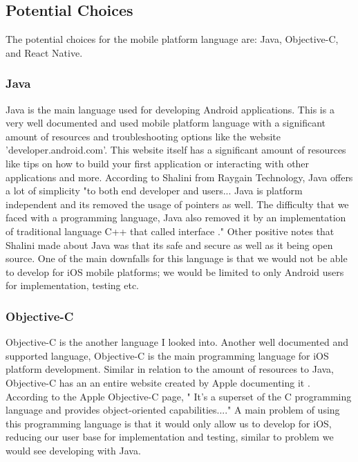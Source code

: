 \documentclass[compsoc, 10, draftclsnofoot, onecolumn]{IEEEtran}
\begin{document}
\subsection{Potential Choices } The potential choices for the mobile platform language are: Java, Objective-C, and React Native. 
\subsubsection{Java}
Java is the main language used for developing Android applications. This is a very well documented and used mobile platform language with a significant amount of resources and troubleshooting options like the website 'developer.android.com'. This website itself has a significant amount of resources like tips on how to build your first application or interacting with other applications and more. According to Shalini from Raygain Technology, Java offers a lot of simplicity "to both end developer and users... Java is platform independent and its removed the usage of pointers as well. The difficulty that we faced with a programming language, Java also removed it by an implementation of traditional language C++ that called interface \cite{r4}." Other positive notes that Shalini made about Java was that its safe and secure as well as it being open source. One of the main downfalls for this language is that we would not be able to develop for iOS mobile platforms; we would be limited to only Android users for implementation, testing etc.

\subsubsection{Objective-C}
\indent Objective-C is the another language I looked into. Another well documented and supported language, Objective-C is the main programming language for iOS platform development. Similar in relation to the amount of resources to Java, Objective-C has an an entire website created by Apple documenting it \cite{r5}. According to the Apple Objective-C page, " It’s a superset of the C programming language and provides object-oriented capabilities...\cite{r5}." A main problem of using this programming language is that it would only allow us to develop for iOS, reducing our user base for implementation and testing, similar to problem we would see developing with Java.  
\end{document}
